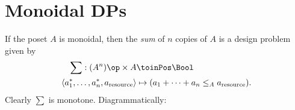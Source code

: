 

\section{Monoidal DPs}



\begin{definition}
  \label{def:sum-resources}
  If the poset $A$ is monoidal, then the \emph{sum} of $n$ copies of $A$ is a design problem given by
  \begin{align*}
    \sum : (A^n)\op \times A &\toinPos \Bool \\
    \langle a_1^*, \dots, a_n^*, a_\text{resource} \rangle &\mapsto (a_1 + \dots + a_n \leq_A a_\text{resource}).
  \end{align*}
  Clearly $\sum$ is monotone. Diagrammatically:
  \begin{center}
  \end{center}
\end{definition}


